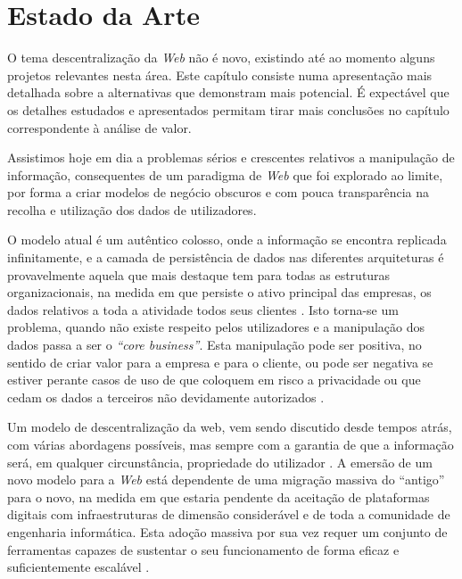 \chapter{Estado da Arte \label{chapter_estado_arte}}
\label{cap:2}

O tema descentralização da \emph{Web} não é novo, existindo até ao momento alguns projetos relevantes nesta área.
Este capítulo consiste numa apresentação mais detalhada sobre a alternativas que demonstram mais potencial.
É expectável que os detalhes estudados e apresentados permitam tirar mais conclusões no capítulo correspondente à análise de valor.

Assistimos hoje em dia a problemas sérios e crescentes relativos a manipulação de informação, consequentes de um paradigma de \emph{Web} que foi explorado ao limite, por forma a criar modelos de negócio obscuros e com pouca transparência na recolha e utilização dos dados de utilizadores.

O modelo atual é um autêntico colosso, onde a informação se encontra replicada infinitamente, e a camada de persistência de dados nas diferentes arquiteturas é provavelmente aquela que mais destaque tem para todas as estruturas organizacionais, na medida em que persiste o ativo principal das empresas, os dados relativos a toda a atividade todos seus clientes \cite{top_three_issues_centralized_web}. Isto torna-se um problema, quando não existe respeito pelos utilizadores e a manipulação dos dados passa a ser o \emph{“core business”}. Esta manipulação pode ser positiva, no sentido de criar valor para a empresa e para o cliente, ou pode ser negativa se estiver perante casos de uso de que coloquem em risco a privacidade ou que cedam os dados a terceiros não devidamente autorizados \cite{facebook_data_hell_medium}.

Um modelo de descentralização da web, vem sendo discutido desde tempos atrás, com várias abordagens possíveis, mas sempre com a garantia de que a informação será, em qualquer circunstância, propriedade do utilizador \cite{why_web_decentralization_future}.
A emersão de um novo modelo para a \emph{Web} está dependente de uma migração massiva do “antigo” para o novo, na medida em que estaria pendente da aceitação de plataformas digitais com infraestruturas de dimensão considerável e de toda a comunidade de engenharia informática. Esta adoção massiva por sua vez requer um conjunto de ferramentas capazes de sustentar o seu funcionamento de forma eficaz e suficientemente escalável \cite{shift_power_to_users}.

